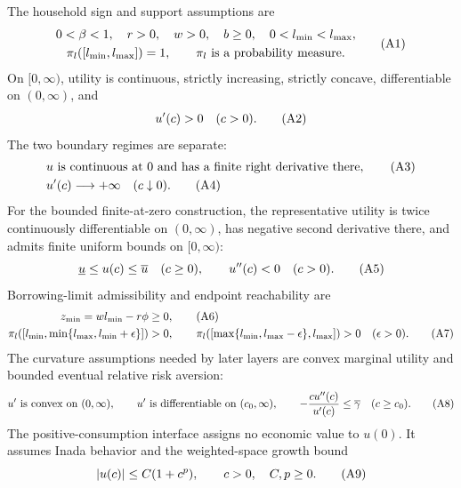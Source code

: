 \documentclass[11pt]{article}
\newcommand{\Icc}[2]{[#1,#2]}
\newcommand{\eqA}[1]{\refstepcounter{equation}\tag{A#1}}
\begin{document}
The household sign and support assumptions are
\begin{equation}
 \begin{gathered}
 0<\beta<1,\quad r>0,\quad w>0,\quad b\ge0,
 \quad 0<l_{\min}<l_{\max},\\
 \pi_l(\Icc{l_{\min}}{l_{\max}})=1,\qquad
 \pi_l\text{ is a probability measure}.
 \end{gathered}
 \eqA{1}\label{A1}
\end{equation}
On \([0,\infty)\), utility is continuous, strictly increasing, strictly
concave, differentiable on \((0,\infty)\), and
\begin{equation}
 u'(c)>0\quad(c>0). \eqA{2}\label{A2}
\end{equation}
The two boundary regimes are separate:
\begin{align}
 &u\text{ is continuous at }0\text{ and has a finite right derivative there},
 \eqA{3}\label{A3}\\
 &u'(c)\longrightarrow+\infty\quad(c\downarrow0). \eqA{4}\label{A4}
\end{align}
For the bounded finite-at-zero construction, the representative utility is
twice continuously differentiable on \((0,\infty)\), has negative second
derivative there, and admits finite uniform bounds on \([0,\infty)\):
\begin{equation}
 \underline u\le u(c)\le\overline u\quad(c\ge0),\qquad u''(c)<0\quad(c>0).
 \eqA{5}\label{A5}
\end{equation}
Borrowing-limit admissibility and endpoint reachability are
\begin{align}
 z_{\min}=wl_{\min}-r\phi&\ge0, \eqA{6}\label{A6}\\
 \pi_l([l_{\min},\min\{l_{\max},l_{\min}+\epsilon\}])&>0,\qquad
 \pi_l([\max\{l_{\min},l_{\max}-\epsilon\},l_{\max}])>0
 \quad(\epsilon>0). \eqA{7}\label{A7}
\end{align}
The curvature assumptions needed by later layers are convex marginal utility
and bounded eventual relative risk aversion:
\begin{equation}
 u'\text{ is convex on }(0,\infty),\qquad
 u'\text{ is differentiable on }(c_0,\infty),\qquad
 -\frac{cu''(c)}{u'(c)}\le\overline\gamma\quad(c\ge c_0). \eqA{8}\label{A8}
\end{equation}
The positive-consumption interface assigns no economic value to \(u(0)\).  It
assumes Inada behavior and the weighted-space growth bound
\begin{equation}
 |u(c)|\le C(1+c^p),\qquad c>0,\quad C,p\ge0. \eqA{9}\label{A9}
\end{equation}
\end{document}
